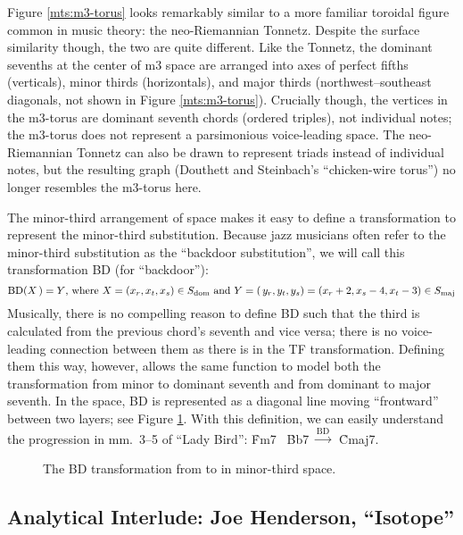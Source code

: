 Figure \ref{mts:m3-torus} looks remarkably similar to a more familiar toroidal
figure common in music theory: the neo-Riemannian Tonnetz. Despite the surface
similarity though, the two are quite different. Like the Tonnetz, the dominant
sevenths at the center of m3 space are arranged into axes of perfect fifths
(verticals), minor thirds (horizontals), and major thirds (northwest--southeast
diagonals, not shown in Figure \ref{mts:m3-torus}). Crucially though, the
vertices in the m3-torus are dominant seventh chords (ordered triples), not
individual notes; the m3-torus does not represent a parsimonious voice-leading
space. The neo-Riemannian Tonnetz can also be drawn to represent triads instead of
individual notes, but the resulting graph (Douthett and Steinbach's
``chicken-wire torus'') no longer resembles the m3-torus here.

The minor-third arrangement of \tf space makes it easy to define a
transformation to represent the minor-third substitution. Because jazz
musicians often refer to the minor-third substitution as the ``backdoor
substitution'',  we will call this transformation BD (for ``backdoor''):%
%
\begin{displaymath}
    \mathrm{BD}(X\,) = Y\text{, where}\ X = (x_r, x_t, x_s) \in S_{\mathrm{dom}}
    \text{ and}\
    Y = (\,y_r, y_t, y_s) = (x_r + 2, x_s - 4, x_t - 3) \in S_{\mathrm{maj}}
\end{displaymath}%
%
Musically, there is no compelling reason to define BD such that the third is
calculated from the previous chord's seventh and vice versa; there is no
voice-leading connection between them as there is in the TF transformation.
Defining them this way, however, allows the same function to model both the
transformation from minor to dominant seventh and from dominant to major
seventh.\fn{mts-4} In the space, BD is represented as a diagonal line moving
``frontward'' between two layers; see Figure \ref{mts:bd-transformation}. With
this definition, we can easily understand the progression in mm.~3--5 of
``Lady Bird'': \h{Fm7} \TFarrow\ \h{Bb7} $\xrightarrow{\mathrm{BD}}$\ \h{Cmaj7}.

\begin{figure}[tbp]
  \caption[The BD transformation in m3 space.]{The BD transformation from
    \caph{Bb7} to \caph{Cmaj7} in minor-third space.}
  \label{mts:bd-transformation}
\end{figure}

\subsection{Analytical Interlude: Joe Henderson, “Isotope”}
\label{sec:henderson-isotope}
\FloatBarrier


